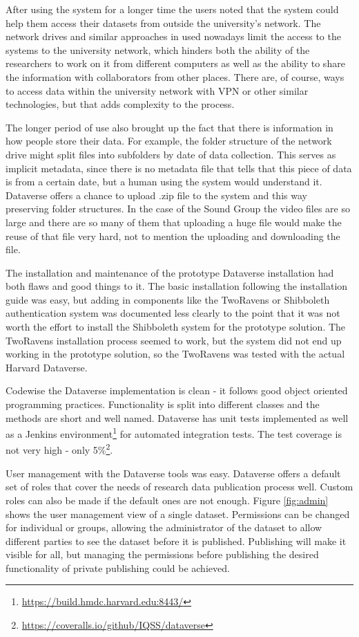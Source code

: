After using the system for a longer time the users noted that the system could
help them access their datasets from outside the university's network. The
network drives and similar approaches in used nowadays limit the access to
the systems to the university network, which hinders both the ability of the
researchers to work on it from different computers as well as the ability to
share the information with collaborators from other places. There are, of
course, ways to access data within the university network with VPN or other
similar technologies, but that adds complexity to the process.

The longer period of use also brought up the fact that there is information in
how people store their data. For example, the folder structure of the network
drive might split files into subfolders by date of data collection. This serves
as implicit metadata, since there is no metadata file that tells that this
piece of data is from a certain date, but a human using the system would
understand it. Dataverse offers a chance to upload .zip file to the system
and this way preserving folder structures. In the case of
the Sound Group the video files are so large and there are so many of them
that uploading a huge file would make the reuse of that file very hard, not
to mention the uploading and downloading the file.

The installation and maintenance of the prototype Dataverse installation had
both flaws and good things to it. The basic installation following the
installation guide was easy, but adding in components like the TwoRavens or
Shibboleth authentication system was documented less clearly to the point that
it was not worth the effort to install the Shibboleth system for the prototype
solution. The TwoRavens installation process seemed to work, but the system
did not end up working in the prototype solution, so the TwoRavens was tested
with the actual Harvard Dataverse.

Codewise the Dataverse implementation is clean - it follows good object
oriented programming practices. Functionality is split into different
classes and the methods are short and well named. Dataverse has unit
tests implemented as well as a Jenkins
environment\footnote{\url{https://build.hmdc.harvard.edu:8443/}} for automated
integration tests. The test coverage is not very high - only
5\%\footnote{\url{https://coveralls.io/github/IQSS/dataverse}}.

User management with the Dataverse tools was easy. Dataverse offers a default
set of roles that cover the needs of research data publication process well.
Custom roles can also be made if the default ones are not enough. Figure
\ref{fig:admin} shows the user management view of a single dataset. Permissions
can be changed for individual or groups, allowing the administrator of the
dataset to allow different parties to see the dataset before it is published.
Publishing will make it visible for all, but managing the permissions before
publishing the desired functionality of private publishing could be achieved.

